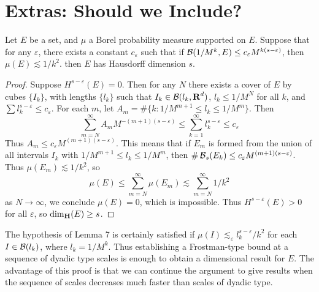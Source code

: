 \section{Extras: Should we Include?}
















\begin{lemma}
	Let $E$ be a set, and $\mu$ a Borel probability measure supported on $E$. Suppose that for any $\varepsilon$, there exists a constant $c_\varepsilon$ such that if $\operatorname{\mathcal{B}}(1/M^k,E) \leq c_\varepsilon M^{k(s-\varepsilon)}$, then $\mu(E) \lesssim 1/k^2$. then $E$ has Hausdorff dimension $s$.
\end{lemma}
\begin{proof}
	Suppose $H^{s-\varepsilon}(E) = 0$. Then for any $N$ there exists a cover of $E$ by cubes $\{ I_k \}$, with lengths $\{ l_k \}$ such that $I_k \in \operatorname{\mathcal{B}}(l_k,\operatorname{\mathbf{R}}^d)$, $l_k \leq 1/M^N$ for all $k$, and $\sum l_k^{s - \varepsilon} \leq c_\varepsilon$. For each $m$, let $A_m = \# \{ k : 1/M^{m+1} \leq l_k \leq 1/M^m \}$. Then
	\[ \sum_{m = N}^\infty A_m M^{-(m+1)(s - \varepsilon)} \leq \sum_{k = 1}^\infty l_k^{s - \varepsilon} \leq c_\varepsilon \]
	Thus $A_m \leq c_\varepsilon M^{(m+1)(s - \varepsilon)}$. This means that if $E_m$ is formed from the union of all intervals $I_k$ with $1/M^{m+1} \leq l_k \leq 1/M^m$, then $\# \operatorname{\mathcal{B}}_s(E_k) \leq c_\varepsilon M^{(m+1)(s-\varepsilon)}$. Thus $\mu(E_m) \lesssim 1/k^2$, so
	\[ \mu(E) \leq \sum_{m = N}^\infty \mu(E_m) \lesssim \sum_{m = N}^\infty 1/k^2 \]
	as $N \to \infty$, we conclude $\mu(E) = 0$, which is impossible. Thus $H^{s-\varepsilon}(E) > 0$ for all $\varepsilon$, so $\operatorname{\dim_{\mathbf{H}}}(E) \geq s$.
\end{proof}

The hypothesis of Lemma 7 is certainly satisfied if $\mu(I) \lesssim_\varepsilon l_k^{s - \varepsilon}/k^2$ for each $I \in \operatorname{\mathcal{B}}(l_k)$, where $l_k = 1/M^k$. Thus establishing a Frostman-type bound at a sequence of dyadic type scales is enough to obtain a dimensional result for $E$. The advantage of this proof is that we can continue the argument to give results when the sequence of scales decreases much faster than scales of dyadic type.

